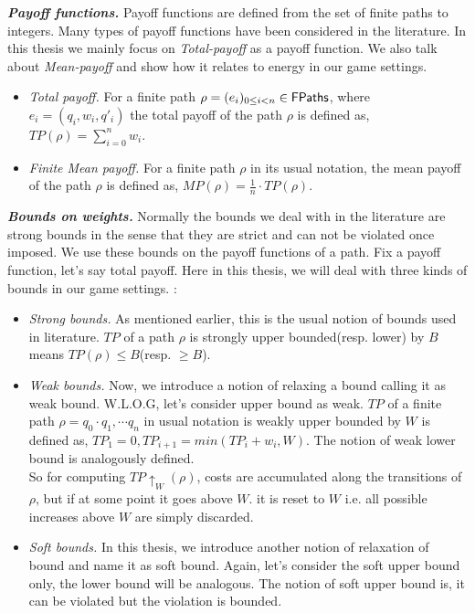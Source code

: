 \textbf{\textit{Payoff functions.}} Payoff functions are defined from the set of finite paths to integers. Many types of payoff functions have been considered in the literature. In this thesis we mainly focus on \textit{Total-payoff} as a payoff function. We also talk about \textit{Mean-payoff} and show how it relates to energy in our game settings.
\begin{itemize}
	\item \textit{Total payoff.} For a finite path $\rho = (e_i)_{0\leq i< n}  \in \textsf{FPaths}$, where $e_i=(q_i,w_i,q'_i)$ the total payoff of the path $\rho$ is defined as, $TP(\rho)= \sum_{i=0}^{n} w_i$.

	\item \textit{Finite Mean payoff.} For a finite path $\rho$ in its usual notation, the mean payoff of the path $\rho$ is defined as, $MP(\rho)= \frac{1}{n}\cdot TP(\rho)$.
\end{itemize}
\vskip 0.6cm


\textbf{\textit{Bounds on weights.}} Normally the bounds we deal with in the literature are strong bounds in the sense that they are strict and can not be violated once imposed. We use these bounds on the payoff functions of a path. Fix a payoff function, let's say total payoff. Here in this thesis, we will deal with three kinds of bounds in our game settings. :
\begin{itemize}
	\item \textit{Strong bounds.} As mentioned earlier, this is the usual notion of bounds used in literature. $TP$ of a path $\rho$ is strongly upper bounded(resp. lower) by $B$ means $TP(\rho) \leq B$(resp. $\geq B$).

	\item \textit{Weak bounds.} Now, we introduce a notion of relaxing a bound calling it as weak bound. W.L.O.G, let's consider upper bound as weak. $TP$ of a finite path $\rho =q_0 \cdot q_1, \cdots q_n $ in usual notation is weakly upper bounded by $W$ is defined as, $TP_1=0, TP_{i+1}= min(TP_i+w_{i}, W)$. The notion of weak lower bound is analogously defined.\\

	So for computing $TP\uparrow_{W}(\rho)$, costs are accumulated along the transitions of $\rho$, but if at some point it goes above $W$. it is reset to $W$ i.e. all possible increases above $W$ are simply discarded.
	
	\item \textit{Soft bounds.} In this thesis, we introduce another notion of relaxation of bound and name it as soft bound. Again, let's consider the soft upper bound only, the lower bound will be analogous. The notion of soft upper bound is, it can be violated but the violation is bounded.
\end{itemize}
\vskip 0.6cm

